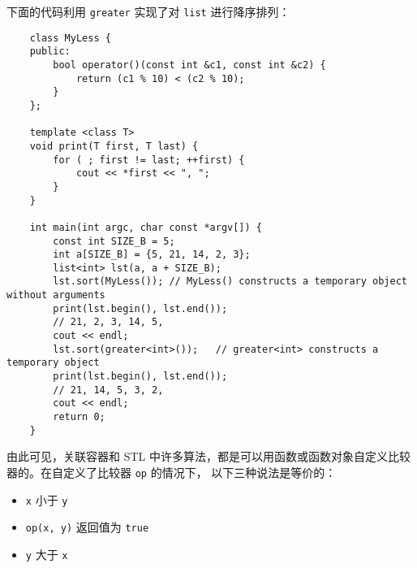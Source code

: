 \documentclass[UTF8]{ctexart}
\begin{document}
下面的代码利用 \texttt{greater} 实现了对 \texttt{list} 进行降序排列：
\begin{verbatim}
    class MyLess {
    public:
        bool operator()(const int &c1, const int &c2) {
            return (c1 % 10) < (c2 % 10);
        }
    };

    template <class T>
    void print(T first, T last) {
        for ( ; first != last; ++first) {
            cout << *first << ", ";
        }
    }

    int main(int argc, char const *argv[]) {
        const int SIZE_B = 5;
        int a[SIZE_B] = {5, 21, 14, 2, 3};
        list<int> lst(a, a + SIZE_B);
        lst.sort(MyLess()); // MyLess() constructs a temporary object without arguments
        print(lst.begin(), lst.end());
        // 21, 2, 3, 14, 5,
        cout << endl;
        lst.sort(greater<int>());   // greater<int> constructs a temporary object
        print(lst.begin(), lst.end());
        // 21, 14, 5, 3, 2,
        cout << endl;
        return 0;
    }
\end{verbatim}

由此可见，关联容器和 STL 中许多算法，都是可以用函数或函数对象自定义比较器的。在自定义了比较器 \texttt{op} 的情况下，
以下三种说法是等价的：
\begin{itemize}
    \item \texttt{x} 小于 \texttt{y}
    \item \texttt{op(x, y)} 返回值为 \texttt{true}
    \item \texttt{y} 大于 \texttt{x}
\end{itemize}
\end{document}
